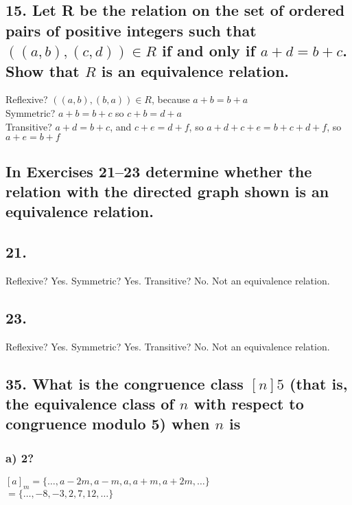 \documentclass[11pt, oneside]{article} %
\numberwithin{equation}{section} %
\numberwithin{figure}{section} %
\numberwithin{table}{section} %
\begin{document}

\subsection{15. Let R be the relation on the set of ordered pairs of positive integers such that $((a, b), (c, d)) \in R$ if and only if $a + d = b + c$. Show that $R$ is an equivalence relation.}
Reflexive? $((a,b),(b,a)) \in R$, because $a+b = b +a$ \\
Symmetric? $a+b = b +c$ so $c+b = d+a$\\
Transitive? $a+d=b+c$, and $c + e = d +f$, so $a+d+c+e = b+c+d+f$, so $a+e=b+f$

\subsection{In Exercises 21–23 determine whether the relation with the
directed graph shown is an equivalence relation.}
\subsection{21.}
Reflexive? Yes. Symmetric? Yes. Transitive? No. Not an equivalence relation.

\subsection{23.}
Reflexive? Yes. Symmetric? Yes. Transitive? No. Not an equivalence relation.


\subsection{35. What is the congruence class $[n]5$ (that is, the equivalence class of $n$ with respect to congruence modulo 5) when $n$ is}
\subsubsection{a) 2?}
$[a]_m = \{ \ldots, a-2m,a-m,a,a+m,a+2m, \ldots \}$ \\
$=\{ \ldots, -8, -3, 2, 7, 12, \ldots \}$
\end{document}
